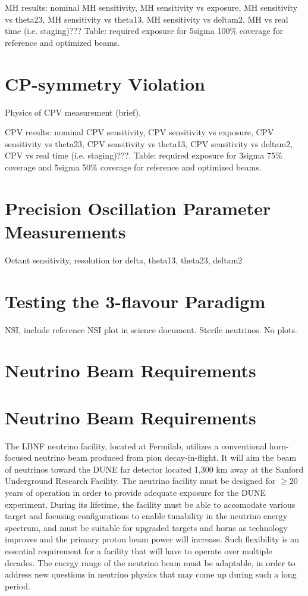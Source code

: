 MH results: nominal MH sensitivity, MH sensitivity vs exposure, MH sensitivity vs theta23, MH sensitivity vs theta13, MH sensitivity vs deltam2, MH vs real time (i.e. staging)???  Table: required exposure for 5sigma 100\% coverage for reference and optimized beams.

\section{CP-symmetry Violation}
\label{sec:physics-lbnosc-cpv}

Physics of CPV measurement (brief).

CPV results: nominal CPV sensitivity, CPV sensitivity vs exposure, CPV sensitivity vs theta23, CPV sensitivity vs theta13, CPV sensitivity vs deltam2, CPV vs real time (i.e. staging)???. Table: required exposure for 3sigma 75\% coverage and 5sigma 50\% coverage for reference and optimized beams.

\section{Precision Oscillation Parameter Measurements}

Octant sensitivity, resolution for delta, theta13, theta23, deltam2

\section{Testing the 3-flavour Paradigm}
\label{sec:physics-lbnosc-3nutests}

NSI, include reference NSI plot in science document.  Sterile neutrinos.  No plots.

\section{Neutrino Beam Requirements}
\section{Neutrino Beam Requirements}
\label{sec:physics-lbnosc-beam-req}
The LBNF neutrino facility, located at Fermilab, utilizes a conventional horn-focused neutrino beam produced from pion decay-in-flight. It will aim the beam of neutrinos toward
the DUNE far detector located 1,300 km away at the Sanford Underground Research Facility. The neutrino facility must be designed for $\ge 20$ years of operation in order to provide adequate exposure for the DUNE experiment. During its lifetime, the facility must be able to accomodate various target and focusing configurations to enable tunability 
in the neutrino energy spectrum, and must be suitable for upgraded targets and horns as technology improves and the primary proton beam power will increase. Such
flexibility is an essential requirement for a facility that will have to operate over multiple decades. The energy range of the neutrino beam must be adaptable, in order to address new questions in neutrino physics that may come up during such a long period.

